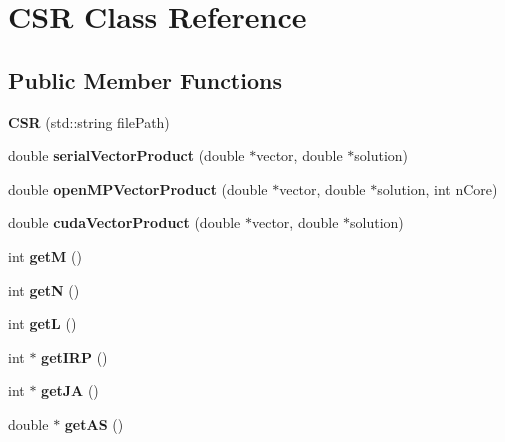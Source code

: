 \hypertarget{classCSR}{}\section{C\+SR Class Reference}
\label{classCSR}
\subsection*{Public Member Functions}
\begin{DoxyCompactItemize}
\item 
\mbox{\label{classCSR_a4da39fab2dd46da3dc9fa76eaa236342}} 
{\bfseries C\+SR} (std\+::string file\+Path)
\item 
\mbox{\label{classCSR_a73b6a5b5e9077b6d28e4bc8fb15f67f9}} 
double {\bfseries serial\+Vector\+Product} (double $\ast$vector, double $\ast$solution)
\item 
\mbox{\label{classCSR_ad957873354841659873b8284a5c38355}} 
double {\bfseries open\+M\+P\+Vector\+Product} (double $\ast$vector, double $\ast$solution, int n\+Core)
\item 
\mbox{\label{classCSR_abb1cfd5c37fbe26ccaa8634efe69889d}} 
double {\bfseries cuda\+Vector\+Product} (double $\ast$vector, double $\ast$solution)
\item 
\mbox{\label{classCSR_a82a8a8862c2192b84ecce7206d7c36be}} 
int {\bfseries getM} ()
\item 
\mbox{\label{classCSR_a3784c499a0a44321356fb66e798dca88}} 
int {\bfseries getN} ()
\item 
\mbox{\label{classCSR_aaed8c084afe319b7db4eebb79c5dbb8b}} 
int {\bfseries getL} ()
\item 
\mbox{\label{classCSR_a8b79fe69106c602b4cae32c19c5882a5}} 
int $\ast$ {\bfseries get\+I\+RP} ()
\item 
\mbox{\label{classCSR_ad6bf68ef459234f9a338cd5512a468da}} 
int $\ast$ {\bfseries get\+JA} ()
\item 
\mbox{\label{classCSR_a6490562b0133ee4392814400bc325841}} 
double $\ast$ {\bfseries get\+AS} ()
\end{DoxyCompactItemize}

